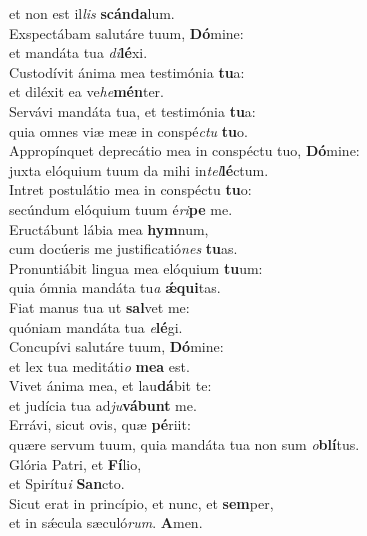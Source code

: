 \oddverse et non est il\textit{lis} \textbf{scán}\textbf{da}lum.\\
\evenverse Exspectábam salutáre tuum, \textbf{Dó}mine:~\*\\
\evenverse et mandáta tua \textit{di}\textbf{lé}xi.\\
\oddverse Custodívit ánima mea testimónia \textbf{tu}a:~\*\\
\oddverse et diléxit ea ve\textit{he}\textbf{mén}ter.\\
\evenverse Servávi mandáta tua, et testimónia \textbf{tu}a:~\*\\
\evenverse quia omnes viæ meæ in conspé\textit{ctu} \textbf{tu}o.\\
\oddverse Appropínquet deprecátio mea in conspéctu tuo, \textbf{Dó}mine:~\*\\
\oddverse juxta elóquium tuum da mihi in\textit{tel}\textbf{lé}ctum.\\
\evenverse Intret postulátio mea in conspéctu \textbf{tu}o:~\*\\
\evenverse secúndum elóquium tuum é\textit{ri}\textbf{pe} me.\\
\oddverse Eructábunt lábia mea \textbf{hym}num,~\*\\
\oddverse cum docúeris me justificatió\textit{nes} \textbf{tu}as.\\
\evenverse Pronuntiábit lingua mea elóquium \textbf{tu}um:~\*\\
\evenverse quia ómnia mandáta tu\textit{a} \textbf{ǽ}\textbf{qui}tas.\\
\oddverse Fiat manus tua ut \textbf{sal}vet me:~\*\\
\oddverse quóniam mandáta tua \textit{e}\textbf{lé}gi.\\
\evenverse Concupívi salutáre tuum, \textbf{Dó}mine:~\*\\
\evenverse et lex tua meditáti\textit{o} \textbf{me}\textbf{a} est.\\
\oddverse Vivet ánima mea, et lau\textbf{dá}bit te:~\*\\
\oddverse et judícia tua ad\textit{ju}\textbf{vá}\textbf{bunt} me.\\
\evenverse Errávi, sicut ovis, quæ \textbf{pé}riit:~\*\\
\evenverse quære servum tuum, quia mandáta tua non sum \textit{o}\textbf{blí}tus.\\
\oddverse Glória Patri, et \textbf{Fí}lio,~\*\\
\oddverse et Spirítu\textit{i} \textbf{San}cto.\\
\evenverse Sicut erat in princípio, et nunc, et \textbf{sem}per,~\*\\
\evenverse et in sǽcula sæculó\textit{rum}. \textbf{A}men.\\

